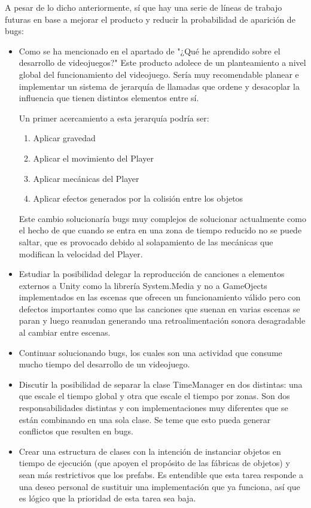 A pesar de lo dicho anteriormente, sí que hay una serie de líneas de trabajo futuras en base a mejorar el producto y reducir la probabilidad de aparición de bugs:

\begin{itemize}
\item
Como se ha mencionado en el apartado de "¿Qué he aprendido sobre el desarrollo de videojuegos?" Este producto adolece de un planteamiento a nivel global del funcionamiento del videojuego. Sería muy recomendable planear e implementar un sistema de jerarquía de llamadas que ordene y desacoplar la influencia que tienen distintos elementos entre sí.

Un primer acercamiento a esta jerarquía podría ser:
\begin{enumerate}
\item
Aplicar gravedad
\item
Aplicar el movimiento del Player
\item
Aplicar mecánicas del Player
\item
Aplicar efectos generados por la colisión entre los objetos
\end{enumerate}

Este cambio solucionaría bugs muy complejos de solucionar actualmente como el hecho de que cuando se entra en una zona de tiempo reducido no se puede saltar, que es provocado debido al solapamiento de las mecánicas que modifican la velocidad del Player.

\item
Estudiar la posibilidad delegar la reproducción de canciones a elementos externos a Unity como la librería System.Media y no a GameOjects implementados en las escenas que ofrecen un funcionamiento válido pero con defectos importantes como que las canciones que suenan en varias escenas se paran y luego reanudan generando una retroalimentación sonora desagradable al cambiar entre escenas.

\item
Continuar solucionando bugs, los cuales son una actividad que consume mucho tiempo del desarrollo de un videojuego.

\item
Discutir la posibilidad de separar la clase TimeManager en dos distintas: una que escale el tiempo global y otra que escale el tiempo
por zonas. Son dos responsabilidades distintas y con implementaciones muy diferentes que se están combinando en una sola clase. Se teme que esto pueda generar conflictos que resulten en bugs.

\item
Crear una estructura de clases con la intención de instanciar objetos en tiempo de ejecución (que apoyen el propósito de las fábricas de objetos) y sean más restrictivos que los prefabs. Es entendible que esta tarea responde a una deseo personal de sustituir una implementación que ya funciona, así que es lógico que la prioridad de esta tarea sea baja.
\end{itemize}